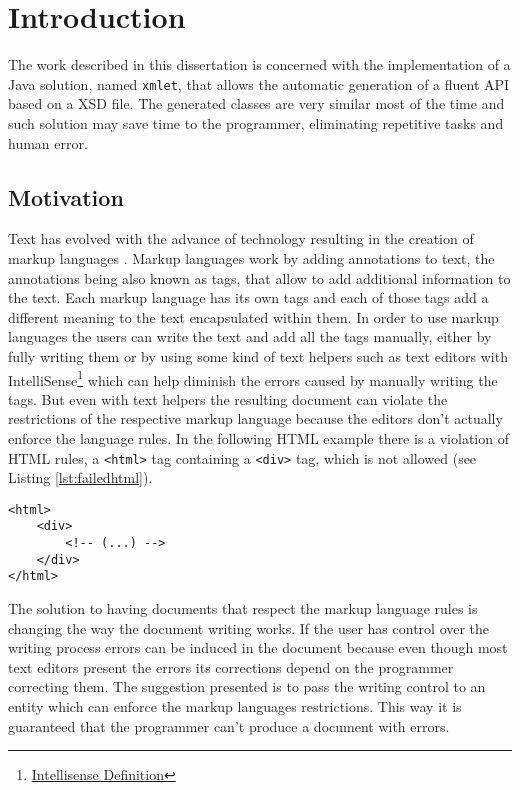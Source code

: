 \chapter{Introduction}
\label{cha:introduction}

The work described in this dissertation is concerned with the implementation of a Java solution, named \texttt{xmlet}, that allows the automatic generation of a fluent \ac{API} based on a \ac{XSD} file. The generated classes are very similar most of the time and such solution may save time to the programmer, eliminating repetitive tasks and human error.

\section{Motivation}

Text has evolved with the advance of technology resulting in the creation of markup languages \cite{markuplanguages}. Markup languages work by adding annotations to text, the annotations being also known as tags, that allow to add additional information to the text. Each markup language has its own tags and each of those tags add a different meaning to the text encapsulated within them. In order to use markup languages the users can write the text and add all the tags manually, either by fully writing them or by using some kind of text helpers such as text editors with IntelliSense\footnote{\href{https://www.techopedia.com/definition/24580/intellisense}{Intellisense Definition}} which can help diminish the errors caused by manually writing the tags. But even with text helpers the resulting document can violate the restrictions of the respective markup language because the editors don't actually enforce the language rules. In the following \ac{HTML} example there is a violation of \ac{HTML} rules, a \texttt{<html>} tag containing a \texttt{<div>} tag, which is not allowed (see Listing \ref{lst:failedhtml}).

\bigskip

\lstset{language=HTML}

\begin{lstlisting}[caption={Failed HTML rule validation},captionpos=b,label={lst:failedhtml}]
<html>
    <div>
        <!-- (...) -->
    </div>
</html>
\end{lstlisting}

\noindent
The solution to having documents that respect the markup language rules is changing the way the document writing works. If the user has control over the writing process errors can be induced in the document because even though most text editors present the errors its corrections depend on the programmer correcting them. The suggestion presented is to pass the writing control to an entity which can enforce the markup languages restrictions. This way it is guaranteed that the programmer can't produce a document with errors. 

